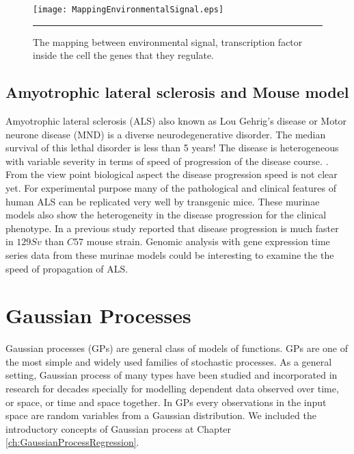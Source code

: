 \begin{figure}%
	\centering
		\texttt{[image: MappingEnvironmentalSignal.eps]}
		\rule{35em}{0.5pt}
	\caption[The mapping between environmental signal, transcription factor 
	inside the cell the genes that they regulate]{The mapping between environmental signal, transcription factor 
	inside the cell the genes that they regulate.}
	\label{fig:MappingEnvironmentalSignal}
\end{figure}


\subsection{Amyotrophic lateral sclerosis and Mouse model}

Amyotrophic lateral sclerosis (ALS) also known as Lou Gehrig's disease or 
Motor neurone disease (MND) is a diverse neurodegenerative 
disorder. The median survival of this lethal disorder is less than 5 years!
The disease is heterogeneous with variable severity in terms of speed of 
progression of the disease course. \cite{Brockington:2013, Peviani:2010}. 
From the view point biological aspect the disease progression speed is not clear yet. 
For experimental purpose many of the pathological and clinical features of human 
ALS can be replicated very well by transgenic mice. These murinae models also
show the heterogeneity in the disease progression for the clinical phenotype. 
In a previous study \cite{Pizzasegola:2009} reported that
disease progression is much faster in $129Sv$ than $C57$ mouse strain.
Genomic analysis with gene expression time series data from these murinae models could 
be interesting to examine the the speed of propagation of ALS.

\section{Gaussian Processes}
Gaussian processes (GPs) are general class of models of functions. 
GPs are one of the most simple and widely used families of stochastic processes. 
As a general setting, Gaussian process of many types have been studied and incorporated 
in research for decades specially for modelling dependent data observed over time, or space, 
or time and space together. In GPs every observations in the input space are random variables
from a Gaussian distribution. We included the introductory concepts of Gaussian process at 
Chapter \ref{ch:GaussianProcessRegression}.

